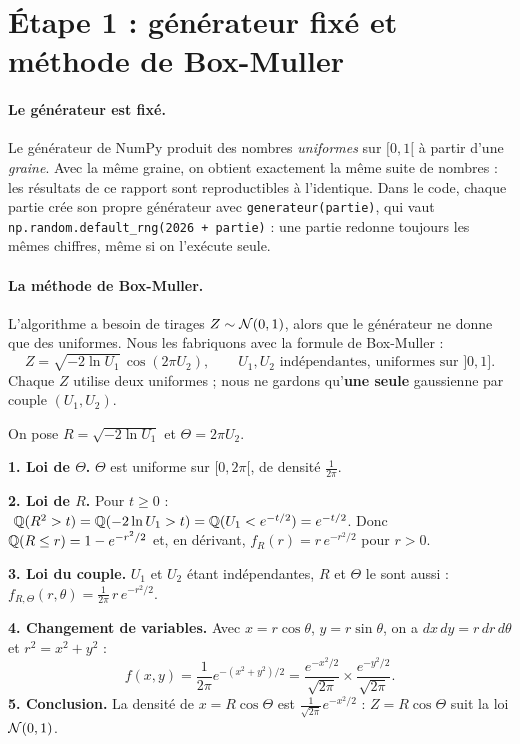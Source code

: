 \section{Étape 1 : générateur fixé et méthode de Box-Muller}\label{sec:bm}

\paragraph{Le générateur est fixé.} Le générateur de NumPy produit des nombres \emph{uniformes} sur $[0,1[$ à partir d'une \emph{graine}. Avec la même graine, on obtient exactement la même suite de nombres : les résultats de ce rapport sont reproductibles à l'identique. Dans le code, chaque partie crée son propre générateur avec \texttt{generateur(partie)}, qui vaut \texttt{np.random.default\_rng(2026 + partie)} : une partie redonne toujours les mêmes chiffres, même si on l'exécute seule.

\paragraph{La méthode de Box-Muller.} L'algorithme a besoin de tirages $Z\sim\mathcal{N}(0,1)$, alors que le générateur ne donne que des uniformes. Nous les fabriquons avec la formule de Box-Muller :
\[
\boxed{Z = \sqrt{-2\ln U_1}\,\cos(2\pi U_2)},\qquad U_1,U_2 \text{ indépendantes, uniformes sur } ]0,1].
\]
Chaque $Z$ utilise deux uniformes ; nous ne gardons qu'\textbf{une seule} gaussienne par couple $(U_1,U_2)$.

\begin{demo}
On pose $R = \sqrt{-2\ln U_1}$ et $\Theta = 2\pi U_2$.

\textbf{1. Loi de $\Theta$.} $\Theta$ est uniforme sur $[0,2\pi[$, de densité $\frac{1}{2\pi}$.

\textbf{2. Loi de $R$.} Pour $t\ge0$ : $\ \mathbb{Q}(R^2>t) = \mathbb{Q}(-2\ln U_1>t) = \mathbb{Q}(U_1<e^{-t/2}) = e^{-t/2}$. Donc $\mathbb{Q}(R\le r) = 1-e^{-r^2/2}$ et, en dérivant, $f_R(r) = r\,e^{-r^2/2}$ pour $r>0$.

\textbf{3. Loi du couple.} $U_1$ et $U_2$ étant indépendantes, $R$ et $\Theta$ le sont aussi : $f_{R,\Theta}(r,\theta) = \frac{1}{2\pi}\,r\,e^{-r^2/2}$.

\textbf{4. Changement de variables.} Avec $x = r\cos\theta$, $y = r\sin\theta$, on a $dx\,dy = r\,dr\,d\theta$ et $r^2 = x^2+y^2$ :
\[
f(x,y) = \frac{1}{2\pi}e^{-(x^2+y^2)/2} = \frac{e^{-x^2/2}}{\sqrt{2\pi}}\times\frac{e^{-y^2/2}}{\sqrt{2\pi}}.
\]
\textbf{5. Conclusion.} La densité de $x = R\cos\Theta$ est $\frac{1}{\sqrt{2\pi}}e^{-x^2/2}$ : $Z = R\cos\Theta$ suit la loi $\mathcal{N}(0,1)$.
\end{demo}

